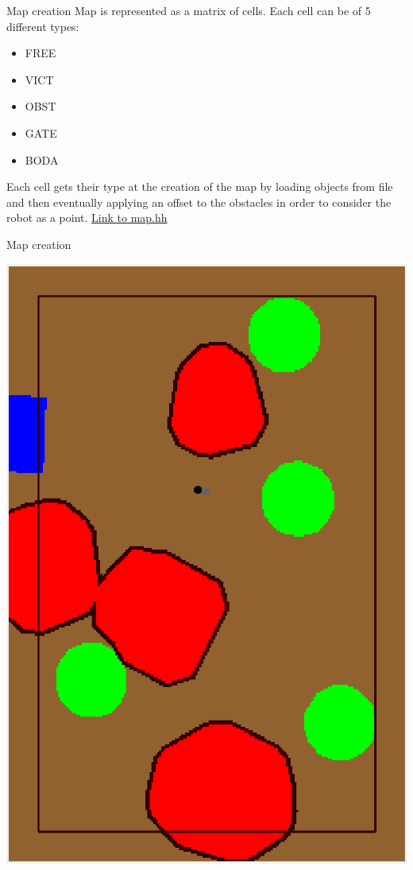 \begin{frame}{Map creation}
Map is represented as a matrix of cells. Each cell can be of 5 different types:
\begin{itemize}
	\item FREE
	\item VICT
	\item OBST
	\item GATE
	\item BODA
\end{itemize}
Each cell gets their type at the creation of the map by loading objects from file and then eventually applying an offset to the obstacles in order to consider the robot as a point.\newline
\href{https://icosac.github.io/LabRoboticsProject/html/map_8hh.html}{Link to map.hh}
\end{frame}

\begin{frame}[fragile]{Map creation}
\begin{center}
	\includegraphics[scale=0.19]{Immagini/map0}
\end{center}
\end{frame}

